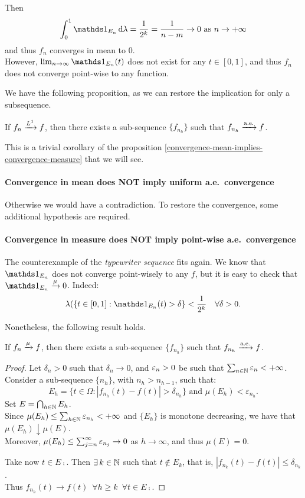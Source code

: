 Then
$$\int_0^1 \Ind_{E_n} \,\dlam =
\frac 1 {2^k} = \frac 1 {n-m}
\to 0
\text{ as } n \to +\infty$$
and thus $f_n$ converges in mean to $0$.\\
However, $\lim_{n\to \infty} \Ind_{E_n}(t)$ does not exist for any $t \in \left[0,1\right]$, and thus $f_n$ does not converge point-wise to any function.


We have the following proposition, as we can restore the implication for only a subsequence.
\begin{prop}\label{convergence-mean-implie-subsequence-ae}
	If $f_n \xrightarrow{L^{1}} f$, then there exists a sub-sequence $\{f_{n_h}\}$ such that $f_{n_h} \xrightarrow{\text{a.e.}} f$.
\end{prop}
This is a trivial corollary of the proposition \vref{convergence-mean-implies-convergence-measure} that we will see.	

\paragraph{Convergence in mean does NOT imply uniform a.e.\ convergence} Otherwise we would have a contradiction. To restore the convergence, some additional hypothesis are required.

\paragraph{Convergence in measure does NOT imply point-wise a.e.\ convergence} The counterexample of the \textit{typewriter sequence} fits again.
We know that $\Ind_{E_n}$ does not converge point-wisely to any $f$, but it is easy to check that $\Ind_{E_n} \mto 0$. Indeed:
$$\lambda (\{t\in \left[0,1\right]:\Ind_{E_n}(t) > \delta\} < \frac {1}{2^k}
\quad \forall \delta > 0.$$

Nonetheless, the following result holds.
\begin{prop}\label{convergence-measure-implie-subsequence-ae}
	If $f_n \xrightarrow{\mu} f$, then there exists a sub-sequence $\{f_{n_h}\}$ such that $f_{n_h} \xrightarrow{\text{a.e.}} f$.
\end{prop}

\begin{proof}
	Let $\delta_n >0$ such that $\delta_n \to 0$, and $\varepsilon_n > 0$ be such that $\sum_{n\in \mathbb N} \varepsilon_n < +\infty$.\\
	Consider a sub-sequence $\{n_h\}$, with $n_h>n_{h-1}$, such that:
	$$ E_h = \{t \in \Omega:|f_{n_h}(t)-f(t)|>\delta_{n_h}\} \text{ and } \mu(E_h) < \varepsilon_{n_h} . $$
	Set $E=\bigcap_{h\in \mathbb N}E_h$.\\
	Since $\mu(E_h)\leq\sum_{h\in \mathbb N}\varepsilon_{n_h} < +\infty$ and $\{E_h\}$ is monotone decreasing, we have that $\mu(E_h) \downarrow \mu(E)$. \\
	Moreover, $\mu(E_h) \leq \sum_{j=n}^{\infty} \varepsilon_{n_j} \to 0$ as $h \to \infty$, and thus $\mu(E)=0$.
	
	Take now $t\in E\comp$. Then $\exists \, k \in \mathbb N$ such that $t\notin E_k$, that is, $|f_{n_k}(t)-f(t)| \leq \delta_{n_k}$. \\
	Thus $f_{n_h}(t) \to f(t) \enspace \forall h \geq k \enspace \forall t \in E\comp$.
\end{proof}

